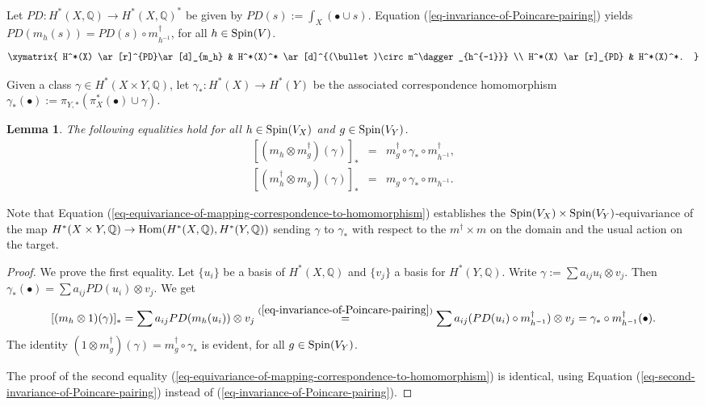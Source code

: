 \documentclass[12pt]{amsart}
\numberwithin{equation}{subsection}
\theoremstyle{plain}
\newtheorem{lem}[thm]{Lemma}
\theoremstyle{definition}
\newcommand{\QQ}{{\mathbb Q}}
\newcommand{\Spin}{{\rm Spin}}
\newcommand{\Hom}{{\rm Hom}}
\begin{document}
Let $PD:H^*(X,\QQ)\rightarrow H^*(X,\QQ)^*$ be given by $PD(s):=\int_X(\bullet\cup s)$.
Equation (\ref{eq-invariance-of-Poincare-pairing}) yields 
$PD(m_h(s))=PD(s)\circ m^\dagger_{h^{-1}}$, for all $h\in \Spin(V)$.
\[
\xymatrix{
H^*(X) \ar[r]^{PD}\ar[d]_{m_h} &
H^*(X)^* \ar[d]^{(\bullet)\circ m^\dagger_{h^{-1}}}
\\
H^*(X) \ar[r]_{PD} & H^*(X)^*.
}
\]


Given a class $\gamma\in H^*(X\times Y,\QQ)$, let $\gamma_*:H^*(X)\rightarrow H^*(Y)$ be the associated correspondence homomorphism $\gamma_*(\bullet):=\pi_{Y,*}(\pi_X^*(\bullet)\cup \gamma)$. 

\begin{lem}
\label{lemma-action-of-m-h-tensor-1}
The following equalities hold for all $h\in \Spin(V_X)$ and $g\in \Spin(V_Y)$.
\begin{eqnarray}
\nonumber
[(m_h\otimes m_g^\dagger)(\gamma)]_*&=&m^\dagger_g\circ \gamma_*\circ m^\dagger_{h^{-1}},
\\
\label{eq-equivariance-of-mapping-correspondence-to-homomorphism}
{}[(m^\dagger_h\otimes m_g)(\gamma)]_*&=&m_g\circ \gamma_*\circ m_{h^{-1}}.
\end{eqnarray} 
\end{lem}

Note that Equation (\ref{eq-equivariance-of-mapping-correspondence-to-homomorphism}) establishes 
the $\Spin(V_X)\times\Spin(V_Y)$-equivariance of the map
$H^*(X\times Y,\QQ)\rightarrow \Hom(H^*(X,\QQ),H^*(Y,\QQ))$ sending $\gamma$ to $\gamma_*$
with respect to the $m^\dagger\times m$ on the domain and the usual action on the target.


\begin{proof}
We prove the first equality.
Let $\{u_i\}$ be a basis of $H^*(X,\QQ)$ and $\{v_j\}$ a basis for $H^*(Y,\QQ)$. Write
$\gamma:=\sum a_{ij}u_i\otimes v_j$. Then $\gamma_*(\bullet)=\sum a_{ij} PD(u_i)\otimes v_j$.
We get
\[
[(m_h\otimes 1)(\gamma)]_*=\sum a_{ij}PD(m_h(u_i))\otimes v_j
\stackrel{(\ref{eq-invariance-of-Poincare-pairing})}{=}
\sum a_{ij}(PD(u_i)\circ m^\dagger_{h^{-1}})\otimes v_j=\gamma_*\circ m^\dagger_{h^{-1}}(\bullet).
\]
The identity $(1\otimes m^\dagger_g)(\gamma)=m^\dagger_g\circ\gamma_*$ is evident, 
for all $g\in\Spin(V_Y)$.

The proof of the second equality 
(\ref{eq-equivariance-of-mapping-correspondence-to-homomorphism})  is identical, using 
Equation (\ref{eq-second-invariance-of-Poincare-pairing}) instead of (\ref{eq-invariance-of-Poincare-pairing}).
\end{proof}
\end{document}

